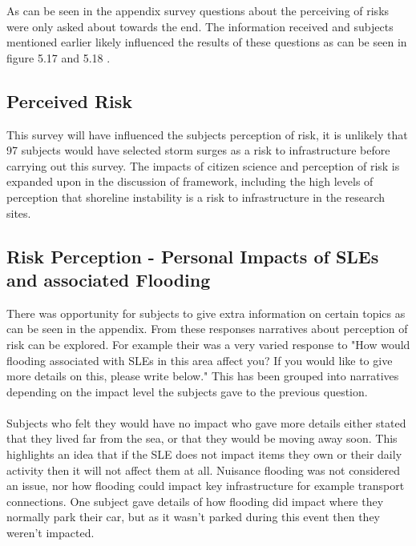 As can be seen in the appendix survey questions about the perceiving of risks were only asked about towards the end. The information received and subjects mentioned earlier likely influenced the results of these questions as can be seen in figure 5.17 and 5.18 .
\paragraph{}
\subsection{Perceived Risk}
This survey will have influenced the subjects perception of risk, it is unlikely that 97 subjects would have selected storm surges as a risk to infrastructure before carrying out this survey. The impacts of citizen science and perception of risk is expanded upon in the discussion of framework, including the high levels of perception that shoreline instability is a risk to infrastructure in the research sites.

\subsection{Risk Perception - Personal Impacts of SLEs and associated Flooding}
There was opportunity for subjects to give extra information on certain topics as can be seen in the appendix. From these responses narratives about perception of risk can be explored. For example their was a very varied response to "How would flooding associated with SLEs in this area affect you? If you would like to give more details on this, please write below." This has been grouped into narratives depending on the impact level the subjects gave to the previous question.
\paragraph{}

Subjects who felt they would have no impact who gave more details either stated that they lived far from the sea, or that they would be moving away soon. This highlights an idea that if the SLE does not impact items they own or their daily activity then it will not affect them at all. Nuisance flooding was not considered an issue, nor how flooding could impact key infrastructure for example transport connections. One subject gave details of how flooding did impact where they normally park their car, but as it wasn't parked during this event then they weren't impacted. 
\paragraph{}


